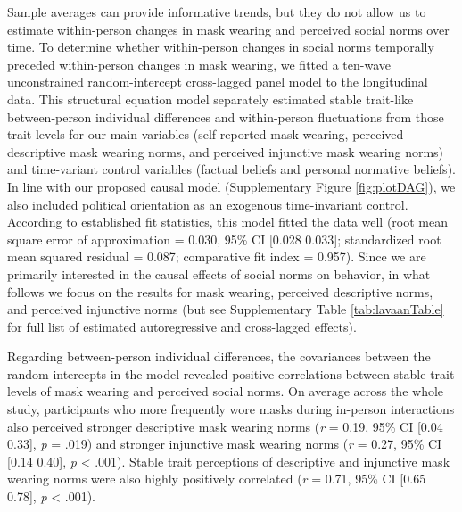 \documentclass[
  man, donotrepeattitle,floatsintext]{apa6}
\begin{document}
Sample averages can provide informative trends, but they do not allow us to estimate within-person changes in mask wearing and perceived social norms over time. To determine whether within-person changes in social norms temporally preceded within-person changes in mask wearing, we fitted a ten-wave unconstrained random-intercept cross-lagged panel model to the longitudinal data. This structural equation model separately estimated stable trait-like between-person individual differences and within-person fluctuations from those trait levels for our main variables (self-reported mask wearing, perceived descriptive mask wearing norms, and perceived injunctive mask wearing norms) and time-variant control variables (factual beliefs and personal normative beliefs). In line with our proposed causal model (Supplementary Figure \ref{fig:plotDAG}), we also included political orientation as an exogenous time-invariant control. According to established fit statistics, this model fitted the data well (root mean square error of approximation = 0.030, 95\% CI {[}0.028 0.033{]}; standardized root mean squared residual = 0.087; comparative fit index = 0.957). Since we are primarily interested in the causal effects of social norms on behavior, in what follows we focus on the results for mask wearing, perceived descriptive norms, and perceived injunctive norms (but see Supplementary Table \ref{tab:lavaanTable} for full list of estimated autoregressive and cross-lagged effects).

Regarding between-person individual differences, the covariances between the random intercepts in the model revealed positive correlations between stable trait levels of mask wearing and perceived social norms. On average across the whole study, participants who more frequently wore masks during in-person interactions also perceived stronger descriptive mask wearing norms (\emph{r} = 0.19, 95\% CI {[}0.04 0.33{]}, \emph{p} = .019) and stronger injunctive mask wearing norms (\emph{r} = 0.27, 95\% CI {[}0.14 0.40{]}, \emph{p} \textless{} .001). Stable trait perceptions of descriptive and injunctive mask wearing norms were also highly positively correlated (\emph{r} = 0.71, 95\% CI {[}0.65 0.78{]}, \emph{p} \textless{} .001).
\end{document}
